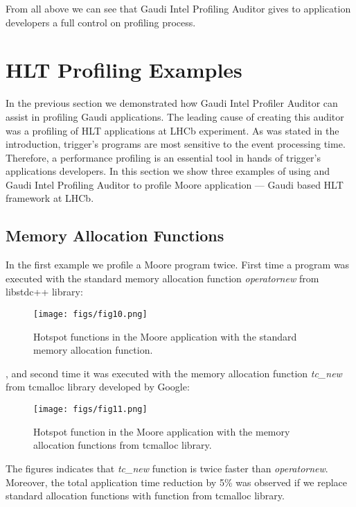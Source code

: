 \documentclass[a4paper]{jpconf}
\begin{document}
From all above we can see that Gaudi Intel Profiling Auditor gives to application developers a full control on 
profiling process.


\section{HLT Profiling Examples}

In the previous section we demonstrated how Gaudi Intel Profiler Auditor can assist  in profiling Gaudi applications. 
The leading cause of  creating this auditor was a profiling of HLT applications at LHCb experiment. 
As was stated in the introduction, trigger’s programs are most sensitive to the event processing time. 
Therefore, a performance profiling is an essential tool in hands of trigger’s applications developers. 
In this section we show three examples of using \amp and Gaudi Intel Profiling Auditor to profile Moore 
application --- Gaudi based HLT framework at LHCb. 

\subsection{Memory Allocation Functions}

In the first example we profile a Moore program twice. First time a program was executed with the standard memory 
allocation function {\it operatornew} from libstdc++ library: 

\begin{figure}[H]
\begin{minipage}{\textwidth}
\texttt{[image: figs/fig10.png]}
\caption{\label{fig10}Hotspot functions in the Moore application with the standard memory allocation function.}
\end{minipage}
\end{figure}

, and second time it was executed with the memory allocation function {\it tc\_new} from tcmalloc library 
developed by Google:

\begin{figure}[H]
\begin{minipage}{\textwidth}
\texttt{[image: figs/fig11.png]}
\caption{\label{fig11}Hotspot function in the Moore application with the memory allocation functions from tcmalloc 
library.}
\end{minipage}
\end{figure}

The figures indicates that {\it tc\_new} function is twice faster than {\it operatornew}. Moreover, the total 
application time reduction by 5\% was observed if we replace standard allocation functions with function 
from tcmalloc library.
\end{document}
